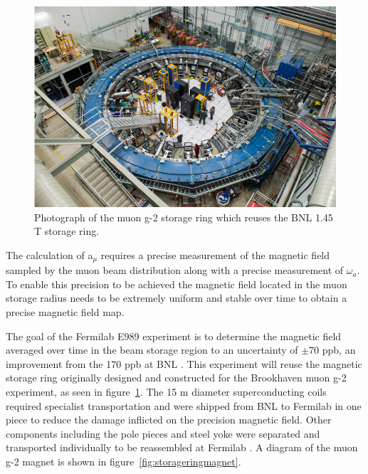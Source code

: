 \begin{figure}[th]
\centering
\includegraphics{Figures/storagering}
\decoRule
\caption{Photograph of the muon g-2 storage ring which reuses the BNL 1.45 T storage ring.}
\label{fig:storagering}
\end{figure}

The calculation of a$_{\mu}$ requires a precise measurement of the magnetic field sampled by the muon beam distribution along with a precise measurement of $\omega{_a}$. 
To enable this precision to be achieved the magnetic field located in the muon storage radius needs to be extremely uniform and stable over time to obtain a precise magnetic field map.
 
The goal of the Fermilab E989 experiment is to determine the magnetic field averaged over time in the beam storage region to an uncertainty of $\pm$70 ppb, an improvement from the 170 ppb at BNL \cite{Reference22}. This experiment will reuse the magnetic storage ring originally designed and constructed for the Brookhaven muon g-2 experiment, as seen in figure~\ref{fig:storagering}. The 15 m diameter superconducting coils required specialist transportation and were shipped from BNL to Fermilab in one piece to reduce the damage inflicted on the precision magnetic field. Other components including the pole pieces and steel yoke were separated and transported individually to be reassembled at Fermilab \cite{magref2}. A diagram of the muon g-2 magnet is shown in figure~\ref{fig:storageringmagnet}.

